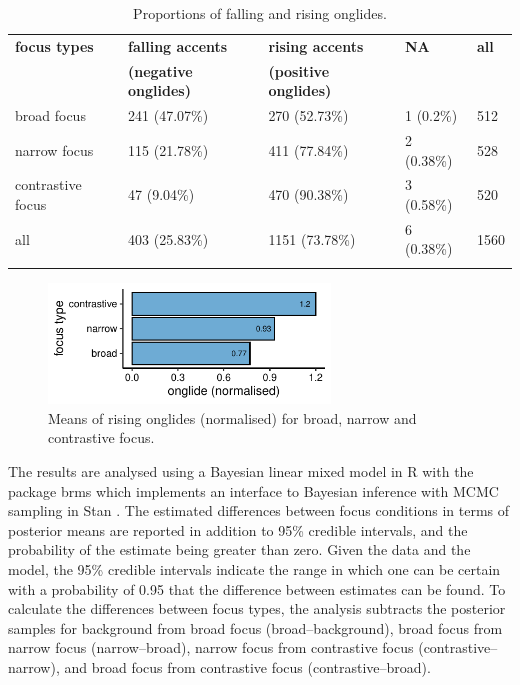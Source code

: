 \begin{table}
\caption{Proportions of falling and rising onglides.}
\begin{tabularx}{\textwidth}{Xllll}
	\lsptoprule
\textbf{focus types	} &	\textbf{falling accents}&		\textbf{rising accents} &			\textbf{NA} & 	\textbf{all}\\
&				\textbf{(negative onglides)} &	\textbf{(positive onglides)} &		&			\\	
\midrule
broad focus &		241 (47.07\%) & 				270 (52.73\%)  & 					1 (0.2\%) &			512 \\
\midrule
narrow focus &		115 (21.78\%)  &				411 (77.84\%) & 					2 (0.38\%)  &			528 \\
\midrule
contrastive focus &		47 (9.04\%)  &					470 (90.38\%) &						3 (0.58\%) &			520 \\
\midrule
all &				403 (25.83\%) &					1151 (73.78\%)  &					6 (0.38\%) &			1560\\\lspbottomrule
\end{tabularx}
\label{tab:props_onglide}
\end{table}%

\begin{figure}
\includegraphics[width=7.5cm]{figures/ch6/onglide_norm_rising_means.pdf}
\caption{Means of rising onglides (normalised) for broad, narrow and contrastive focus.}
\label{fig:onglide_means}
\end{figure}

The results are analysed using a Bayesian linear mixed model in R \citep{RCoreTeam2018} with the package brms \citep{Buerkner2018} which implements an interface to Bayesian inference with MCMC sampling in Stan \citep{Carpenteretal2017}. The estimated differences between focus conditions in terms of posterior means are reported in addition to 95\% credible intervals, and the probability of the estimate being greater than zero. Given the data and the model, the 95\% credible intervals indicate the range in which one can be certain with a probability of 0.95 that the difference between estimates can be found. To calculate the differences between focus types,  the analysis subtracts the posterior samples for background from broad focus (broad–background), broad focus from narrow focus (narrow–broad), narrow focus from contrastive focus (contrastive–narrow), and broad focus from contrastive focus (contrastive–broad).

